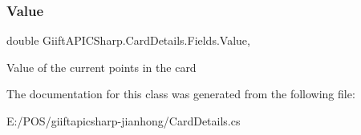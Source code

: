 \subsubsection{\texorpdfstring{Value}{Value}}
{\footnotesize\ttfamily double Giift\+A\+P\+I\+C\+Sharp.\+Card\+Details.\+Fields.\+Value\hspace{0.3cm}{\ttfamily [get]}, {\ttfamily [set]}}



Value of the current points in the card 



The documentation for this class was generated from the following file\+:\begin{DoxyCompactItemize}
\item 
E\+:/\+P\+O\+S/giiftapicsharp-\/jianhong/Card\+Details.\+cs\end{DoxyCompactItemize}
